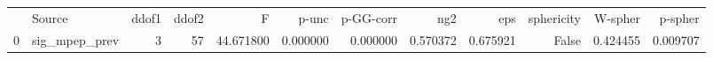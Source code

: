\begin{tabular}{llrrrrrrrrrr}
 & Source & ddof1 & ddof2 & F & p-unc & p-GG-corr & ng2 & eps & sphericity & W-spher & p-spher \\
0 & sig_mpep_prev & 3 & 57 & 44.671800 & 0.000000 & 0.000000 & 0.570372 & 0.675921 & False & 0.424455 & 0.009707 \\
\end{tabular}
